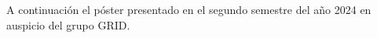 A continuación el póster presentado en el segundo semestre del año 2024 en auspicio del grupo GRID.




